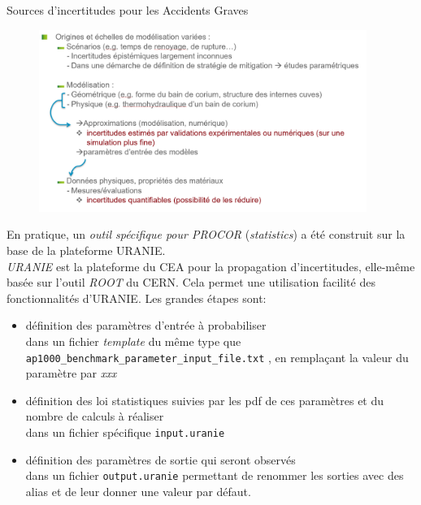 \begin{frame}[fragile]
Sources d'incertitudes pour les Accidents Graves
\begin{figure}
\centering \includegraphics[width=0.95\textwidth]{Figures/Stat_OriginesIncert.png} 
\end{figure}


\end{frame}


\begin{frame}[fragile]
En pratique, un \emph{outil spécifique pour PROCOR} (\textit{statistics}) a été construit sur la base de la plateforme URANIE.\\
\emph{URANIE} est la plateforme du CEA pour la propagation d'incertitudes, elle-même basée sur l'outil \emph{ROOT} du CERN.
Cela permet une utilisation facilité des fonctionnalités d'URANIE. Les grandes étapes sont: 
\begin{itemize}
\item définition des paramètres d'entrée à probabiliser \\
dans un fichier \textit{template} du même type que \texttt{ap1000\_benchmark\_parameter\_input\_file.txt} , en remplaçant la valeur du paramètre par \textit{xxx}

\item définition des loi statistiques suivies par les pdf de ces paramètres et du nombre de calculs à réaliser\\
dans un fichier spécifique \texttt{input.uranie}

\item définition des paramètres de sortie qui seront observés \\
dans un fichier \texttt{output.uranie} permettant de renommer les sorties avec des alias et de leur donner une valeur par défaut.

\end{itemize}

\end{frame}


